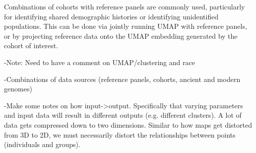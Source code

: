 \documentclass[12pt]{article}
\begin{document}
Combinations of cohorts with reference panels are commonly used, particularly for identifying shared demographic histories or identifying unidentified populations. This can be done via jointly running UMAP with reference panels, or by projecting reference data onto the UMAP embedding generated by the cohort of interest.



-Note: Need to have a comment on UMAP/clustering and race

-Combinations of data sources (reference panels, cohorts, ancient and modern genomes)

-Make some notes on how input->output. Specifically that varying parameters and input data will result in different outputs (e.g. different clusters). A lot of data gets compressed down to two dimensions. Similar to how maps get distorted from 3D to 2D, we must necessarily distort the relationships between points (individuals and groups).



\end{document}
